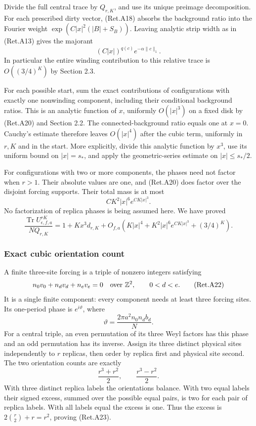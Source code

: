 Divide the full central trace by \(Q_{r,K}\), and use its unique
preimage decomposition. For each prescribed dirty vector, (Ret.A18)
absorbs the background ratio into the Fourier weight
\(\exp(C|x|^2(|B|+S_B))\).
Leaving analytic strip width as in (Ret.A13) gives the majorant
\[
                 (C|x|)^{q(c)}e^{-\alpha\|c\|_1}.          \tag{Ret.A20}
\]
In particular the entire winding contribution to this relative trace
is \(O((3/4)^K)\) by Section 2.3.

For each possible start, sum the exact contributions of configurations
with exactly one nonwinding component, including their conditional
background ratios. This is an analytic function of \(x\), uniformly
\(O(|x|^3)\) on a fixed disk by (Ret.A20) and Section 2.2.
The connected-background ratio equals one at \(x=0\).
Cauchy's estimate therefore leaves \(O(|x|^4)\) after the cubic term,
uniformly in \(r,K\) and in the start. More explicitly, divide this
analytic function by \(x^3\), use its uniform bound on \(|x|=s_*\),
and apply the geometric-series estimate on \(|x|\le s_*/2\).

For configurations with two or more components, the phases need
not factor when \(r>1\). Their absolute values are one, and (Ret.A20)
does factor over the disjoint forcing supports. Their total mass
is at most
\[
       C K^2|x|^6 e^{CK|x|^3}.
\]
No factorization of replica phases is being assumed here.
We have proved
\[
 \frac{\operatorname{Tr}U_{\epsilon,f,a}^{rK}}{NQ_{r,K}}
 =1+Kx^3d_{r,K}
    +O_{f,a}\!\left(K|x|^4+
                K^2|x|^6e^{CK|x|^3}+(3/4)^K\right).        \tag{Ret.A21}
\]

\hypertarget{exact-cubic-orientation-count}{%
\subsubsection{Exact cubic orientation count}\label{exact-cubic-orientation-count}}

A finite three-site forcing is a triple of nonzero integers satisfying
\[
 n_0v_0+n_dv_d+n_ev_e=0 \quad\hbox{over }\mathbb Z^2,
                      \qquad 0<d<e.                       \tag{Ret.A22}
\]
It is a single finite component: every component needs at least three
forcing sites. Its one-period phase is \(e^{i\vartheta}\), where
\[
       \vartheta=\frac{2\pi a^2 n_0n_d b_d}{N}.
\]
For a central triple, an even permutation of its three Weyl factors
has this phase and an odd permutation has its inverse.
Assign its three distinct physical sites independently to \(r\) replicas,
then order by replica first and physical site second.
The two orientation counts are exactly
\[
             \frac{r^3+r^2}{2},\qquad\frac{r^3-r^2}{2}.     \tag{Ret.A23}
\]
With three distinct replica labels the orientations balance.
With two equal labels their signed excess, summed over the possible
equal pairs, is two for each pair of replica labels.
With all labels equal the excess is one.
Thus the excess is \(2\binom r2+r=r^2\), proving (Ret.A23).

